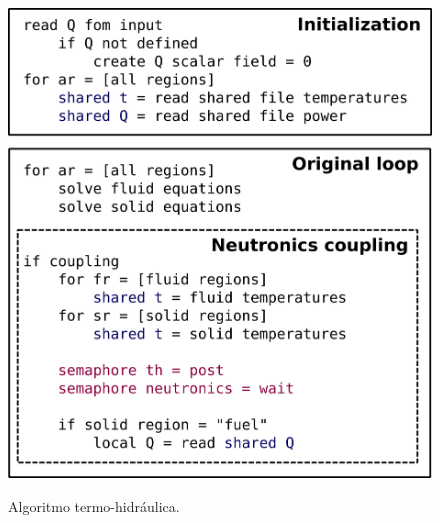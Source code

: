 \begin{figure}[htb]
  \caption{Algoritmo termo-hidráulica.}
  \centering\includegraphics[scale=0.5]{figuras/algoritmo_openfoam.png}
  \label{fig:algo_th}
\end{figure}

